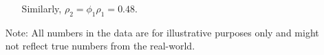 \documentclass[12pt, oneside]{article}
\begin{document}
\begin{enumerate}
\begin{enumerate}
Similarly, $\rho_2 = \phi_1\rho_1 = 0.48$.





\end{enumerate}

\item[Note: ] All numbers in the data are for illustrative purposes only and might not reflect true numbers from the real-world.

\end{enumerate}
\end{document}
